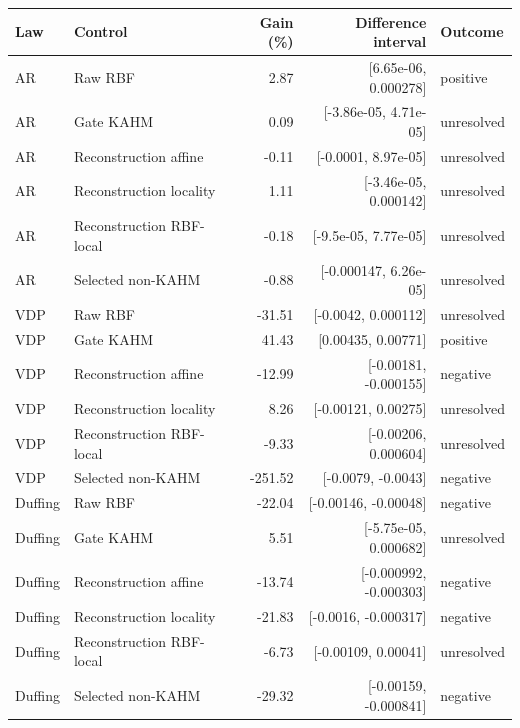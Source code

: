 \begin{tabular}{llrrl}
\toprule
Law & Control & Gain (\%) & Difference interval & Outcome \\
\midrule
AR & Raw RBF & 2.87 & [6.65e-06, 0.000278] & positive \\
AR & Gate KAHM & 0.09 & [-3.86e-05, 4.71e-05] & unresolved \\
AR & Reconstruction affine & -0.11 & [-0.0001, 8.97e-05] & unresolved \\
AR & Reconstruction locality & 1.11 & [-3.46e-05, 0.000142] & unresolved \\
AR & Reconstruction RBF-local & -0.18 & [-9.5e-05, 7.77e-05] & unresolved \\
AR & Selected non-KAHM & -0.88 & [-0.000147, 6.26e-05] & unresolved \\
VDP & Raw RBF & -31.51 & [-0.0042, 0.000112] & unresolved \\
VDP & Gate KAHM & 41.43 & [0.00435, 0.00771] & positive \\
VDP & Reconstruction affine & -12.99 & [-0.00181, -0.000155] & negative \\
VDP & Reconstruction locality & 8.26 & [-0.00121, 0.00275] & unresolved \\
VDP & Reconstruction RBF-local & -9.33 & [-0.00206, 0.000604] & unresolved \\
VDP & Selected non-KAHM & -251.52 & [-0.0079, -0.0043] & negative \\
Duffing & Raw RBF & -22.04 & [-0.00146, -0.00048] & negative \\
Duffing & Gate KAHM & 5.51 & [-5.75e-05, 0.000682] & unresolved \\
Duffing & Reconstruction affine & -13.74 & [-0.000992, -0.000303] & negative \\
Duffing & Reconstruction locality & -21.83 & [-0.0016, -0.000317] & negative \\
Duffing & Reconstruction RBF-local & -6.73 & [-0.00109, 0.00041] & unresolved \\
Duffing & Selected non-KAHM & -29.32 & [-0.00159, -0.000841] & negative \\
\bottomrule
\end{tabular}
